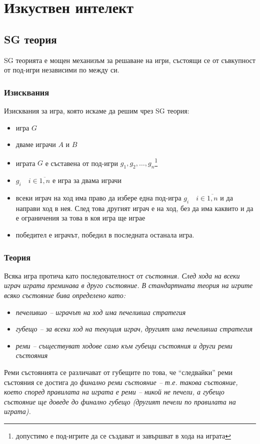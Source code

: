 \documentclass[a4paper]{article}
\begin{document}
\section{Изкуствен интелект}
  \subsection{SG теория}
  SG теорията е мощен механизъм за решаване на игри, състоящи се от съвкупност
  от под-игри независими по между си.
  
    \subsubsection{Изисквания}
    Изисквания за игра, която искаме да решим чрез SG теория:
    \begin{itemize}
      \item игра $G$
      \item дваме играчи $A$ и $B$
      \item играта $G$ е съставена от под-игри $g_1, g_2, \dots,
      g_n$\footnote{допустимо е под-игрите да се създават и завършват в хода на
      играта}
      \item $g_i \quad i \in \overline{1,n}$  е игра за двама играчи
      \item всеки играч на ход има право да избере една под-игра $g_i \quad i \in
      \overline{1,n}$ и да направи ход в нея. След това другият играч е на ход,
      без да има каквито и да е ограничения за това в коя игра ще играе
      \item победител е играчът, победил в последната останала игра.
    \end{itemize}
  
    \subsubsection{Теория}
    Всяка игра протича като последователност от \em състояния\em. След хода на
    всеки играч играта преминава в друго състояние. В стандартната теория на
    игрите всяко състояние бива определено като:
    \begin{itemize}
      \item \em печелившо \em -- играчът на ход има печеливша стратегия \\
      \item \em губещо \em -- за всеки ход на текущия играч, другият има
      печеливша стратегия \\
      \item \em реми \em -- съществуват ходове само към губещи състояния
      и други реми състояния
    \end{itemize}
    Реми състоянията се различават от губещите по това, че ``следвайки'' реми
    състояния се достига до \em финално \em реми състояние -- т.е. такова
    състояние, което според правилата на играта е реми -- никой не печели,
    а губещо състояние ще доведе до финално губещо (другият печели по
    правилата на играта).
\end{document}
